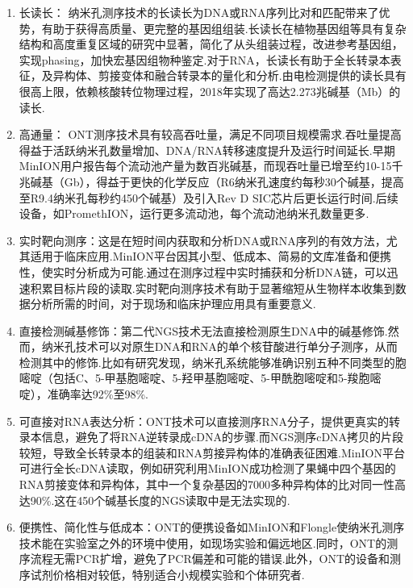 \begin{enumerate}
	\item 长读长：
	纳米孔测序技术的长读长为DNA或RNA序列比对和匹配带来了优势，有助于获得高质量、更完整的基因组组装.长读长在植物基因组等具有复杂结构和高度重复区域的研究中显著，简化了从头组装过程，改进参考基因组，实现phasing，加快宏基因组物种鉴定.对于RNA，长读长有助于全长转录本表征，及异构体、剪接变体和融合转录本的量化和分析.由电检测提供的读长具有很高上限，依赖核酸转位物理过程，2018年实现了高达2.273兆碱基（Mb）的读长\cite{gong2019ultra}.
	
	\item 高通量：
	ONT测序技术具有较高吞吐量，满足不同项目规模需求.吞吐量提高得益于活跃纳米孔数量增加、DNA/RNA转移速度提升及运行时间延长.早期MinION用户报告每个流动池产量为数百兆碱基，而现吞吐量已增至约10-15千兆碱基（Gb），得益于更快的化学反应（R6纳米孔速度约每秒30个碱基，提高至R9.4纳米孔每秒约450个碱基）及引入Rev D SIC芯片后更长运行时间.后续设备，如PromethION，运行更多流动池，每个流动池纳米孔数量更多\cite{nicholls2019ultra}.
	
	
	\item 实时靶向测序：这是在短时间内获取和分析DNA或RNA序列的有效方法，尤其适用于临床应用.MinION平台因其小型、低成本、简易的文库准备和便携性，使实时分析成为可能\cite{loose2016real}.通过在测序过程中实时捕获和分析DNA链，可以迅速积累目标片段的读取.实时靶向测序技术有助于显著缩短从生物样本收集到数据分析所需的时间，对于现场和临床护理应用具有重要意义.
	
	\item 直接检测碱基修饰：第二代NGS技术无法直接检测原生DNA中的碱基修饰.然而，纳米孔技术可以对原生DNA和RNA的单个核苷酸进行单分子测序，从而检测其中的修饰.比如有研究发现，纳米孔系统能够准确识别五种不同类型的胞嘧啶\cite{wescoe2014nanopores}（包括C、5-甲基胞嘧啶、5-羟甲基胞嘧啶、5-甲酰胞嘧啶和5-羧胞嘧啶），准确率达92\%至98\%.
	
	\item 可直接对RNA表达分析：ONT技术可以直接测序RNA分子，提供更真实的转录本信息，避免了将RNA逆转录成cDNA的步骤.而NGS测序cDNA拷贝的片段较短，导致全长转录本的组装和RNA剪接异构体的准确表征困难.MinION平台可进行全长cDNA读取，例如研究利用MinION成功检测了果蝇中四个基因的RNA剪接变体和异构体，其中一个复杂基因的7000多种异构体的比对同一性高达90\%.这在450个碱基长度的NGS读取中是无法实现的\cite{bolisetty2015determining}.
	
	\item 便携性、简化性与低成本：ONT的便携设备如MinION和Flongle使纳米孔测序技术能在实验室之外的环境中使用，如现场实验和偏远地区.同时，ONT的测序流程无需PCR扩增，避免了PCR偏差和可能的错误.此外，ONT的设备和测序试剂价格相对较低，特别适合小规模实验和个体研究者.
	
\end{enumerate}


